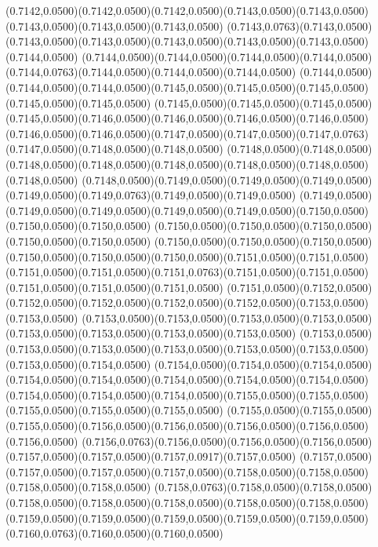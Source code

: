 (0.7142,0.0500)(0.7142,0.0500)(0.7142,0.0500)(0.7143,0.0500)(0.7143,0.0500)(0.7143,0.0500)(0.7143,0.0500)(0.7143,0.0500)
(0.7143,0.0763)(0.7143,0.0500)(0.7143,0.0500)(0.7143,0.0500)(0.7143,0.0500)(0.7143,0.0500)(0.7143,0.0500)(0.7144,0.0500)
(0.7144,0.0500)(0.7144,0.0500)(0.7144,0.0500)(0.7144,0.0500)(0.7144,0.0763)(0.7144,0.0500)(0.7144,0.0500)(0.7144,0.0500)
(0.7144,0.0500)(0.7144,0.0500)(0.7144,0.0500)(0.7145,0.0500)(0.7145,0.0500)(0.7145,0.0500)(0.7145,0.0500)(0.7145,0.0500)
(0.7145,0.0500)(0.7145,0.0500)(0.7145,0.0500)(0.7145,0.0500)(0.7146,0.0500)(0.7146,0.0500)(0.7146,0.0500)(0.7146,0.0500)
(0.7146,0.0500)(0.7146,0.0500)(0.7147,0.0500)(0.7147,0.0500)(0.7147,0.0763)(0.7147,0.0500)(0.7148,0.0500)(0.7148,0.0500)
(0.7148,0.0500)(0.7148,0.0500)(0.7148,0.0500)(0.7148,0.0500)(0.7148,0.0500)(0.7148,0.0500)(0.7148,0.0500)(0.7148,0.0500)
(0.7148,0.0500)(0.7149,0.0500)(0.7149,0.0500)(0.7149,0.0500)(0.7149,0.0500)(0.7149,0.0763)(0.7149,0.0500)(0.7149,0.0500)
(0.7149,0.0500)(0.7149,0.0500)(0.7149,0.0500)(0.7149,0.0500)(0.7149,0.0500)(0.7150,0.0500)(0.7150,0.0500)(0.7150,0.0500)
(0.7150,0.0500)(0.7150,0.0500)(0.7150,0.0500)(0.7150,0.0500)(0.7150,0.0500)
\PST@Solid(0.7150,0.0500)(0.7150,0.0500)(0.7150,0.0500)(0.7150,0.0500)(0.7150,0.0500)(0.7150,0.0500)(0.7151,0.0500)(0.7151,0.0500)
(0.7151,0.0500)(0.7151,0.0500)(0.7151,0.0763)(0.7151,0.0500)(0.7151,0.0500)(0.7151,0.0500)(0.7151,0.0500)(0.7151,0.0500)
(0.7151,0.0500)(0.7152,0.0500)(0.7152,0.0500)(0.7152,0.0500)(0.7152,0.0500)(0.7152,0.0500)(0.7153,0.0500)(0.7153,0.0500)
(0.7153,0.0500)(0.7153,0.0500)(0.7153,0.0500)(0.7153,0.0500)(0.7153,0.0500)(0.7153,0.0500)(0.7153,0.0500)(0.7153,0.0500)
(0.7153,0.0500)(0.7153,0.0500)(0.7153,0.0500)(0.7153,0.0500)(0.7153,0.0500)(0.7153,0.0500)(0.7153,0.0500)(0.7154,0.0500)
(0.7154,0.0500)(0.7154,0.0500)(0.7154,0.0500)(0.7154,0.0500)(0.7154,0.0500)(0.7154,0.0500)(0.7154,0.0500)(0.7154,0.0500)
(0.7154,0.0500)(0.7154,0.0500)(0.7154,0.0500)(0.7155,0.0500)(0.7155,0.0500)(0.7155,0.0500)(0.7155,0.0500)(0.7155,0.0500)
(0.7155,0.0500)(0.7155,0.0500)(0.7155,0.0500)(0.7156,0.0500)(0.7156,0.0500)(0.7156,0.0500)(0.7156,0.0500)(0.7156,0.0500)
(0.7156,0.0763)(0.7156,0.0500)(0.7156,0.0500)(0.7156,0.0500)(0.7157,0.0500)(0.7157,0.0500)(0.7157,0.0917)(0.7157,0.0500)
(0.7157,0.0500)(0.7157,0.0500)(0.7157,0.0500)(0.7157,0.0500)(0.7158,0.0500)(0.7158,0.0500)(0.7158,0.0500)(0.7158,0.0500)
(0.7158,0.0763)(0.7158,0.0500)(0.7158,0.0500)(0.7158,0.0500)(0.7158,0.0500)(0.7158,0.0500)(0.7158,0.0500)(0.7158,0.0500)
(0.7159,0.0500)(0.7159,0.0500)(0.7159,0.0500)(0.7159,0.0500)(0.7159,0.0500)(0.7160,0.0763)(0.7160,0.0500)(0.7160,0.0500)
